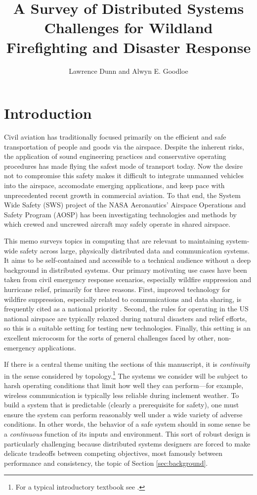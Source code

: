 \documentclass[]             %
{NASA}                       %
\title{A Survey of Distributed Systems Challenges for Wildland
  Firefighting and Disaster Response}
\author{Lawrence Dunn and Alwyn E. Goodloe}
\theoremstyle{definition}
\begin{document}
\newpage
\setcounter{tocdepth}{2}
\tableofcontents
\newpage

\section{Introduction}\label{introduction}

Civil aviation has traditionally focused primarily on the efficient
and safe transportation of people and goods via the airspace. Despite
the inherent risks, the application of sound engineering practices and
conservative operating procedures has made flying the safest mode of
transport today. Now the desire not to compromise this safety makes it
difficult to integrate unmanned vehicles into the airspace, accomodate
emerging applications, and keep pace with unprecedented recent growth
in commercial aviation. To that end, the System Wide Safety (SWS)
project of the NASA Aeronautics' Airspace Operations and Safety
Program (AOSP) has been investigating technologies and methods by
which crewed and uncrewed aircraft may safely operate in shared
airspace.

This memo surveys topics in computing that are relevant to maintaining
system-wide safety across large, physically distributed data and
communication systems. It aims to be self-contained and accessible to
a technical audience without a deep background in distributed
systems. Our primary motivating use cases have been taken from civil
emergency response scenarios, especially wildfire suppression and
hurricane relief, primarily for three reasons. First, improved
technology for wildfire suppression, especially related to
communications and data sharing, is frequently cited as a national
priority \cite{pcast2023}.  Second, the rules for operating in the US
national airspace are typically relaxed during natural disasters and
relief efforts, so this is a suitable setting for testing new
technologies. Finally, this setting is an excellent microcosm for the
sorts of general challenges faced by other, non-emergency
applications.

If there is a central theme uniting the sections of this manuscript,
it is \emph{continuity} in the sense considered by
topology.\footnote{For a typical introductory textbook see
\cite{mendelson2012introduction}.} The systems we consider will be
subject to harsh operating conditions that limit how well they can
perform---for example, wireless communication is typically less
reliable during inclement weather. To build a system that is
predictable (clearly a prerequisite for safety), one must ensure the
system can perform reasonably well under a wide variety of adverse
conditions. In other words, the behavior of a safe system should in
some sense be a \emph{continuous} function of its inputs and
environment. This sort of robust design is particularly challenging
because distributed systems designers are forced to make delicate
tradeoffs between competing objectives, most famously between
performance and consistency, the topic of Section
\ref{sec:background}.
\end{document}
